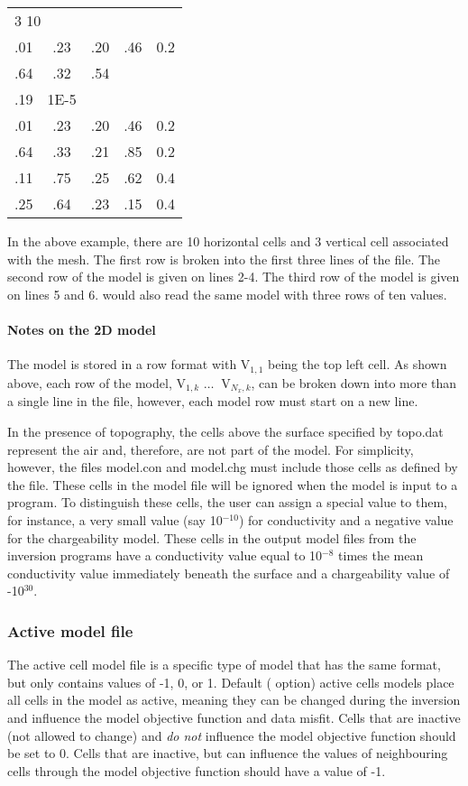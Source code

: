 \begin{fileExample}
\begin{tabular}{|ccccc|}
\hline
\multicolumn{5}{|l|}{3 10} \\
.01 & .23 & .20 & .46 & 0.2 \\
.64 & .32 & .54 &  & \\
.19 & 1E-5 & & &\\
.01 & .23 & .20 & .46 & 0.2 \\
.64 & .33 & .21 & .85 & 0.2 \\
.11 & .75 & .25 & .62 & 0.4 \\
.25 & .64 & .23 & .15 & 0.4 \\
\hline
\end{tabular}
\end{fileExample}

In the above example, there are 10 horizontal cells and 3 vertical cell associated with the mesh. The first row is broken into the first three lines of the file. The second row of the model is given on lines 2-4. The third row of the model is given on lines 5 and 6.  would also read the same model with three rows of ten values. 

\paragraph{Notes on the 2D model} The model is stored in a row format with V$_{1,1}$ being the top left cell. As shown above, each row of the model, V$_{1,k}$ $ \hdots\ $ V$_{N_x,k}$, can be broken down into more than a single line in the file, however, each model row must start on a new line.

In the presence of topography, the cells above the surface specified by topo.dat represent the air and, therefore, are not part of the model. For simplicity, however, the files model.con and model.chg must include those cells as defined by the  file. These cells in the model file will be ignored when the model is input to a program. To distinguish these cells, the user can assign a special value to them, for instance, a very small value (say 10$^{-10}$) for conductivity and a negative value for the chargeability model. These cells in the output model files from the inversion programs have a conductivity value equal to 10$^{-8}$ times the mean conductivity value immediately beneath the surface and a chargeability value of -10$^{30}$.

\subsubsection*{Active model file}
The active cell model file is a specific type of model that has the same format, but only contains values of -1, 0, or 1. Default ( option) active cells models place all cells in the model as active, meaning they can be changed during the inversion and influence the model objective function and data misfit. Cells that are inactive (not allowed to change) and \textit{do not} influence the model objective function should be set to 0. Cells that are inactive, but can influence the values of neighbouring cells through the model objective function should have a value of -1.